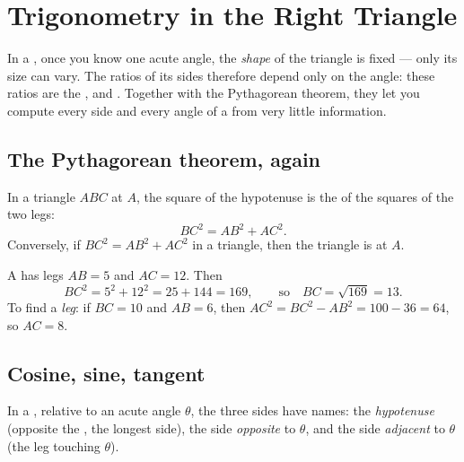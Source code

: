 \chapter{Trigonometry in the Right Triangle}\label{ch:g9:trig}

In a , once you know one acute angle, the \emph{shape} of
the triangle is fixed --- only its size can vary. The ratios of its sides
therefore depend only on the angle: these ratios are the ,  and
. Together with the Pythagorean theorem, they let you compute
every side and every angle of a  from very little
information.

\section{The Pythagorean theorem, again}

\begin{theorem}[Pythagoras]\label{thm:g9:trig:pythagoras}
In a triangle $ABC$  at $A$, the square of the hypotenuse is
the  of the squares of the two legs:
\[
BC^2 = AB^2 + AC^2 .
\]
Conversely, if $BC^2 = AB^2 + AC^2$ in a triangle, then the triangle is
 at $A$.
\end{theorem}
\admitted

\begin{example}\label{ex:g9:trig:pythagoras}
A  has legs $AB = 5$ and $AC = 12$. Then
\[
BC^2 = 5^2 + 12^2 = 25 + 144 = 169,
\qquad\text{so}\quad BC = \sqrt{169} = 13 .
\]
To find a \emph{leg}: if $BC = 10$ and $AB = 6$, then
$AC^2 = BC^2 - AB^2 = 100 - 36 = 64$, so $AC = 8$.
\end{example}

\section{Cosine, sine, tangent}

In a , relative to an acute angle $\theta$, the three sides
have names: the \emph{hypotenuse} (opposite the , the longest
side), the side \emph{opposite} to $\theta$, and the side
\emph{adjacent} to $\theta$ (the leg touching $\theta$).

